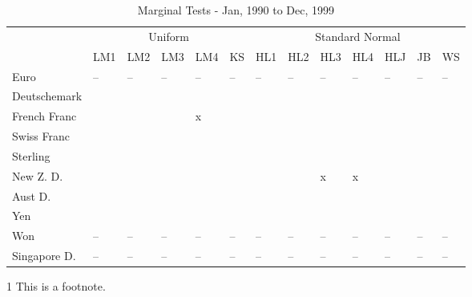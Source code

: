 \documentclass[12pt]{article}
\begin{document}
\begin{table}
	\caption{Marginal Tests - Jan, 1990 to Dec, 1999}
	\begin{threeparttable}
		\begin{tabular}[l]{l l l l l l l l l l l l l}
	    \hline
	& \multicolumn{5}{c}{Uniform}  & \multicolumn{7}{c}{Standard Normal} \\
			            & LM1        & LM2        & LM3        & LM4        & KS         & HL1        & HL2        & HL3        & HL4        & HLJ        & JB         & WS \\
	\hline
	    Euro            & --  & --  & --  & --  & -- & --  & --  & --  & --  & --  & -- & -- \\
		Deutschemark    & \checkplus & \checkmark & \checkplus & \checkmark & \checkplus & \checkplus & \checkplus & \checkplus & \checkplus & \checkplus & \checkplus & \checkplus \\
		French Franc    & \checkplus & \checkmark & \checkplus & x          & \checkplus & \checkplus & \checkplus & \checkplus & \checkplus & \checkplus & \checkplus & \checkplus \\
		Swiss Franc     & \checkplus & \checkplus & \checkplus & \checkplus & \checkplus & \checkplus & \checkplus & \checkplus & \checkplus & \checkplus & \checkplus & \checkplus \\
		Sterling        & \checkplus & \checkplus & \checkmark & \checkplus & \checkplus & \checkplus & \checkplus & \checkplus & \checkplus & \checkplus & \checkplus & \checkplus \\
		New Z. D.       & \checkplus & \checkmark & \checkplus & \checkplus & \checkplus & \checkplus & \checkplus & x          & x          & \checkplus & \checkplus & \checkplus \\
		Aust D.         & \checkplus & \checkplus & \checkplus & \checkplus & \checkplus & \checkplus & \checkplus & \checkplus & \checkplus & \checkplus & \checkplus & \checkplus \\
		Yen             & \checkplus & \checkplus & \checkplus & \checkplus & \checkplus & \checkplus & \checkplus & \checkplus & \checkplus & \checkplus & \checkplus & \checkplus \\
		Won             & --  & --  & --  & --  & -- & --  & --  & --  & --  & --  & -- & -- \\
		Singapore D.    & --  & --  & --  & --  & -- & --  & --  & --  & --  & --  & -- & -- \\
	\hline
		\end{tabular}
		\begin{tablenotes}
			\item[1]{\footnotesize This is a footnote.}
		\end{tablenotes}
	\end{threeparttable}
\end{table}
\end{document}
